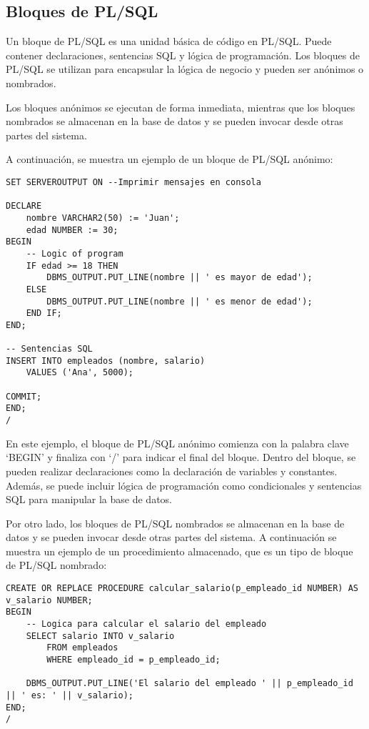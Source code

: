 \documentclass[executivepaper]{article}
\begin{document}
\subsection{Bloques de PL/SQL}
Un bloque de PL/SQL es una unidad básica de código en PL/SQL. Puede contener declaraciones, sentencias SQL y lógica de programación. Los bloques de PL/SQL se utilizan para encapsular la lógica de negocio y pueden ser anónimos o nombrados.

Los bloques anónimos se ejecutan de forma inmediata, mientras que los bloques nombrados se almacenan en la base de datos y se pueden invocar desde otras partes del sistema.

A continuación, se muestra un ejemplo de un bloque de PL/SQL anónimo:

\begin{lstlisting}
SET SERVEROUTPUT ON --Imprimir mensajes en consola

DECLARE
    nombre VARCHAR2(50) := 'Juan';
    edad NUMBER := 30;
BEGIN
    -- Logic of program
    IF edad >= 18 THEN
        DBMS_OUTPUT.PUT_LINE(nombre || ' es mayor de edad');
    ELSE
        DBMS_OUTPUT.PUT_LINE(nombre || ' es menor de edad');
    END IF;
END;

-- Sentencias SQL
INSERT INTO empleados (nombre, salario)
    VALUES ('Ana', 5000);

COMMIT;
END;
/
\end{lstlisting}

En este ejemplo, el bloque de PL/SQL anónimo comienza con la palabra clave \enquote*{BEGIN} y finaliza con \enquote*{/} para indicar el final del bloque. Dentro del bloque, se pueden realizar declaraciones como la declaración de variables y constantes. Además, se puede incluir lógica de programación como condicionales y sentencias SQL para manipular la base de datos.

Por otro lado, los bloques de PL/SQL nombrados se almacenan en la base de datos y se pueden invocar desde otras partes del sistema. A continuación se muestra un ejemplo de un procedimiento almacenado, que es un tipo de bloque de PL/SQL nombrado:

\begin{lstlisting}
CREATE OR REPLACE PROCEDURE calcular_salario(p_empleado_id NUMBER) AS
v_salario NUMBER;
BEGIN
    -- Logica para calcular el salario del empleado
    SELECT salario INTO v_salario
        FROM empleados
        WHERE empleado_id = p_empleado_id;

    DBMS_OUTPUT.PUT_LINE('El salario del empleado ' || p_empleado_id || ' es: ' || v_salario);
END;
/
\end{lstlisting}
\end{document}
